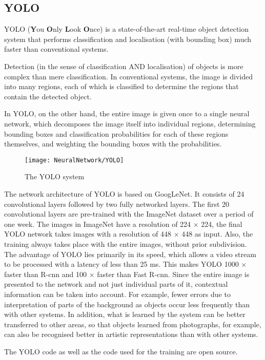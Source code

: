 	
\subsection{YOLO}

YOLO (\textbf{Y}ou \textbf{O}nly \textbf{L}ook \textbf{O}nce) is a state-of-the-art real-time object detection system that performs classification and localisation (with bounding box) much faster than conventional systems.\cite{Redmon.17.02.2021}

Detection (in the sense of classification AND localisation) of objects is more complex than mere classification. In conventional systems, the image is divided into many regions, each of which is classified to determine the regions that contain the detected object. \cite{Chablani:2017}

In YOLO, on the other hand, the entire image is given once to a single neural network, which decomposes the image itself into individual regions, determining bounding boxes and classification probabilities for each of these regions themselves, and weighting the bounding boxes with the probabilities.

\begin{figure}[H]
	\begin{center}
		\texttt{[image: NeuralNetwork/YOLO]}
		\caption{The YOLO system} 
		\label{YOLO}
	\end{center}
\end{figure}

The network architecture of YOLO is based on GoogLeNet. It consists of 24 convolutional layers followed by two fully networked layers. The first 20 convolutional layers are pre-trained with the ImageNet dataset over a period of one week. The images in ImageNet have a resolution of 224 $\times$ 224, the final YOLO network takes images with a resolution of 448 $\times$ 448 as input. Also, the training always takes place with the entire images, without prior subdivision. \cite{Redmon.08.06.2015}\\

The advantage of YOLO lies primarily in its speed, which allows a video stream to be processed with a latency of less than 25 ms. This makes YOLO 1000 $\times$ faster than R-\ac{cnn} and 100 $\times$ faster than Fast R-\ac{cnn}. Since the entire image is presented to the network and not just individual parts of it, contextual information can be taken into account. For example, fewer errors due to interpretation of parts of the background as objects occur less frequently than with other systems. In addition, what is learned by the system can be better transferred to other areas, so that objects learned from photographs, for example, can also be recognised better in artistic representations than with other systems.  \cite{Redmon.08.06.2015} \cite{Redmon.17.02.2021}

The YOLO code as well as the code used for the training are open source.

